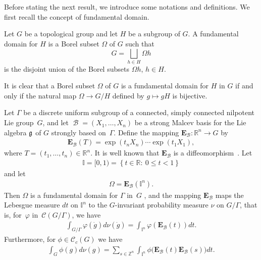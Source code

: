 \documentclass[pdftex]{sigma}
\newcommand{\set}[1]{\left\{#1\right\}}
\DeclareMathOperator{\bbase}{\mathscr{B}}
\def\dsz{{\mathds Z}}
\def\tore{{\mathbb I}}
\begin{document}
 Before stating the next result, we introduce some notations and
def\/initions. We f\/irst recall the concept of fundamental domain.

\begin{definition} Let $G$ be a topological group and let $H$ be a
subgroup of $G$. A fundamental domain for $H$ is a Borel subset
$\Omega$ of $G$ such that
\[
G= \bigsqcup_{h\in H} \Omega h
\] is
the disjoint union of the Borel subsets $ \Omega h$, $h\in H $.
\end{definition}


\begin{remark}
It is clear that a Borel subset  $\Omega$ of $G$ is a
fundamental domain for $H$ in $G$ if and only if  the natural map
$\Omega \rightarrow G/H$ def\/ined by $g\mapsto gH$ is
bijective.
\end{remark}

Let $\Gamma$ be a discrete uniform subgroup of a connected, simply
connected nilpotent Lie group~$G$, and let $ \bbase =(X_1, \ldots,
X_n)$ be a strong Malcev basis for the Lie algebra $\frak g$ of $G$
strongly based on~$\Gamma$. Def\/ine the mapping $\mathbf{E}_{\bbase}:
\mathds{R}^n\rightarrow G$ by
\begin{gather*}
\mathbf{E}_{\bbase}(T) = \exp(t_n X_n)\cdots \exp(t_1 X_1),
\end{gather*}
where $T= (t_1, \ldots, t_n)\in \mathds{R}^n$. It is well known that
 $\mathbf{E}_{\bbase}$ is a dif\/feomorphism~\cite{Cor1}. Let
\begin{gather*}%
\tore = [0, 1) = \set{t\in \mathds{R}:\ 0\leq t < 1}
\end{gather*}
and let
\begin{gather*}%
\Omega= \mathbf{E}_{\bbase}(\tore^n).
\end{gather*}
Then $\Omega$ is a fundamental domain for $\Gamma$  in~$G$
\cite[Lemma~3.6]{Cor9}, and the mapping $\mathbf{E}_{\bbase}$ maps
the Lebesgue measure $dt$ on $\tore^n$ to the $G$-invariant
probability measure $\nu$ on $G/\Gamma$, that is, for~$\varphi $ in~$ \mathcal{C}(G/\Gamma)$, we have
\begin{gather*}%
\int_{G/\Gamma} \varphi( \dot{g}) d\nu( \dot{g}) = \int_{\tore^n}
\varphi( \mathbf{E}_{\bbase}(t)) dt.
\end{gather*}
Furthermore, for $\phi\in \mathcal{C}_c(G)$ we have
\begin{gather}\label{measure-fundamental-domain1}
\int_{G} \phi(g) d\nu(g) =  \sum_{s\in \dsz^n}\int_{\tore^n}
\phi\big( \mathbf{E}_{\bbase}(t) \mathbf{E}_{\bbase}(s)\big) dt.
\end{gather}
\end{document}
